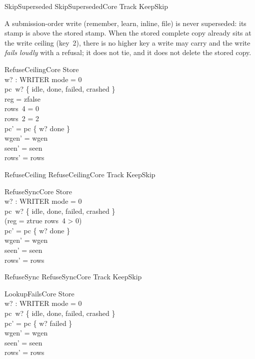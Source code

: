 \documentclass[a4paper,10pt,fleqn]{article}
\begin{document}
\begin{zed}
SkipSuperseded  SkipSupersededCore \land Track \land KeepSkip
\end{zed}

A submission-order write (remember, learn, inline, file) is never superseded:
its stamp is above the stored stamp. When the stored complete copy already sits
at the write ceiling (key~2), there is no higher key a write may carry and the
write \emph{fails loudly} with a refusal; it does not tie, and it does not
delete the stored copy.

\begin{schema}{RefuseCeilingCore}
\Delta Store \\ w? : WRITER
\where
mode = 0 \\
pc~w? \in \{ idle, done, failed, crashed \} \\
reg = zfalse \\
rows~4 = 0 \\
rows~2 = 2 \\
pc' = pc \oplus \{ w? \mapsto done \} \\
wgen' = wgen \\
seen' = seen \\
rows' = rows
\end{schema}

\begin{zed}
RefuseCeiling  RefuseCeilingCore \land Track \land KeepSkip
\end{zed}

\begin{schema}{RefuseSyncCore}
\Delta Store \\ w? : WRITER
\where
mode = 0 \\
pc~w? \in \{ idle, done, failed, crashed \} \\
(reg = ztrue \lor rows~4 > 0) \\
pc' = pc \oplus \{ w? \mapsto done \} \\
wgen' = wgen \\
seen' = seen \\
rows' = rows
\end{schema}

\begin{zed}
RefuseSync  RefuseSyncCore \land Track \land KeepSkip
\end{zed}

\begin{schema}{LookupFailsCore}
\Delta Store \\ w? : WRITER
\where
mode = 0 \\
pc~w? \in \{ idle, done, failed, crashed \} \\
pc' = pc \oplus \{ w? \mapsto failed \} \\
wgen' = wgen \\
seen' = seen \\
rows' = rows
\end{schema}
\end{document}

